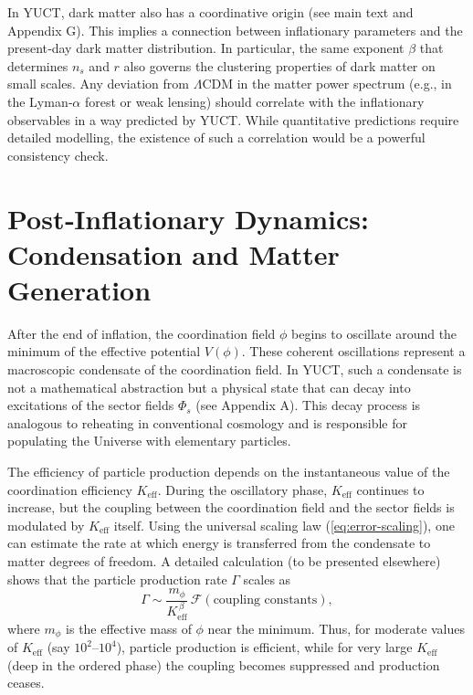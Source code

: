 \documentclass[12pt]{article}
\theoremstyle{remark}
\newcommand{\Keff}{K_{\mathrm{eff}}}
\begin{document}
	In YUCT, dark matter also has a coordinative origin (see main text and Appendix G). This implies a connection between inflationary parameters and the present‑day dark matter distribution. In particular, the same exponent $\beta$ that determines $n_s$ and $r$ also governs the clustering properties of dark matter on small scales. Any deviation from $\Lambda$CDM in the matter power spectrum (e.g., in the Lyman‑$\alpha$ forest or weak lensing) should correlate with the inflationary observables in a way predicted by YUCT. While quantitative predictions require detailed modelling, the existence of such a correlation would be a powerful consistency check.
	
	\section{Post‑Inflationary Dynamics: Condensation and Matter Generation}
	\label{sec:postinflation}
	
	After the end of inflation, the coordination field $\phi$ begins to oscillate around the minimum of the effective potential $V(\phi)$. These coherent oscillations represent a macroscopic condensate of the coordination field. In YUCT, such a condensate is not a mathematical abstraction but a physical state that can decay into excitations of the sector fields $\Phi_s$ (see Appendix A). This decay process is analogous to reheating in conventional cosmology and is responsible for populating the Universe with elementary particles.
	
	The efficiency of particle production depends on the instantaneous value of the coordination efficiency $\Keff$. During the oscillatory phase, $\Keff$ continues to increase, but the coupling between the coordination field and the sector fields is modulated by $\Keff$ itself. Using the universal scaling law (\ref{eq:error-scaling}), one can estimate the rate at which energy is transferred from the condensate to matter degrees of freedom. A detailed calculation (to be presented elsewhere) shows that the particle production rate $\Gamma$ scales as
	\begin{equation}
		\Gamma \sim \frac{m_\phi}{\Keff^{\,\beta}} \, \mathcal{F}(\text{coupling constants}),
		\label{eq:gamma}
	\end{equation}
	where $m_\phi$ is the effective mass of $\phi$ near the minimum. Thus, for moderate values of $\Keff$ (say $10^2$–$10^4$), particle production is efficient, while for very large $\Keff$ (deep in the ordered phase) the coupling becomes suppressed and production ceases.
	
\end{document}
